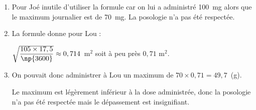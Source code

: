 
\medskip

% 
% 
%
% 
%
%
%
%

\begin{enumerate}
\item %
Pour Joé inutile d’utiliser la formule car on lui a administré 100~mg alors que le maximum journalier est de 70~mg. La posologie n’a pas  été respectée.
\item %
La formule donne pour Lou :

$\sqrt{\dfrac{105 \times 17,5}{\np{3600}}} \approx 0,714$~m$^2$ soit à peu près $0,71$ m$^2$.
\medskip

 
\item %
On pouvait donc administrer à Lou un maximum de $70 \times  0,71 = 49,7$~(g).

Le maximum est légèrement inférieur à la dose administrée, donc la posologie n’a pas été respectée mais le dépassement est insignifiant.
\end{enumerate}

